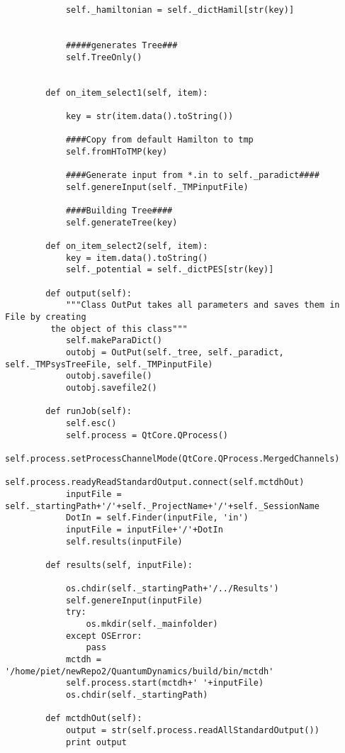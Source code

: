 \begin{verbatim}
            self._hamiltonian = self._dictHamil[str(key)]
    
    
            #####generates Tree###
            self.TreeOnly()
    
    
        def on_item_select1(self, item):
    
            key = str(item.data().toString())        
    
            ####Copy from default Hamilton to tmp
            self.fromHToTMP(key)
    
            ####Generate input from *.in to self._paradict####
            self.genereInput(self._TMPinputFile)
    
            ####Building Tree####
            self.generateTree(key)
    
        def on_item_select2(self, item):
            key = item.data().toString()
            self._potential = self._dictPES[str(key)]
    
        def output(self):
            """Class OutPut takes all parameters and saves them in File by creating
         the object of this class"""
            self.makeParaDict()
            outobj = OutPut(self._tree, self._paradict, self._TMPsysTreeFile, self._TMPinputFile)
            outobj.savefile()
            outobj.savefile2()
    
        def runJob(self):
            self.esc()
            self.process = QtCore.QProcess()
            self.process.setProcessChannelMode(QtCore.QProcess.MergedChannels)
            self.process.readyReadStandardOutput.connect(self.mctdhOut)
            inputFile = self._startingPath+'/'+self._ProjectName+'/'+self._SessionName
            DotIn = self.Finder(inputFile, 'in')
            inputFile = inputFile+'/'+DotIn
            self.results(inputFile)
    
        def results(self, inputFile):
    
            os.chdir(self._startingPath+'/../Results')
            self.genereInput(inputFile)
            try:
                os.mkdir(self._mainfolder)
            except OSError:
                pass
            mctdh = '/home/piet/newRepo2/QuantumDynamics/build/bin/mctdh'
            self.process.start(mctdh+' '+inputFile)
            os.chdir(self._startingPath)
    
        def mctdhOut(self):
            output = str(self.process.readAllStandardOutput())
            print output
\end{verbatim}